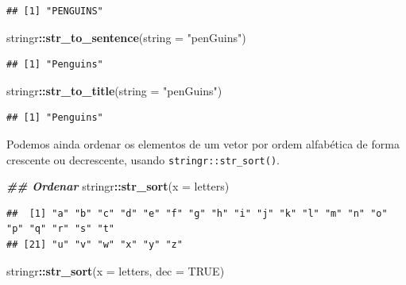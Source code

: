 \documentclass[
]{article}
\newenvironment{Shaded}{\begin{snugshade}}{\end{snugshade}}
\newcommand{\AttributeTok}[1]{\textcolor[rgb]{0.13,0.29,0.53}{#1}}
\newcommand{\ConstantTok}[1]{\textcolor[rgb]{0.56,0.35,0.01}{#1}}
\newcommand{\DocumentationTok}[1]{\textcolor[rgb]{0.56,0.35,0.01}{\textbf{\textit{#1}}}}
\newcommand{\FunctionTok}[1]{\textcolor[rgb]{0.13,0.29,0.53}{\textbf{#1}}}
\newcommand{\NormalTok}[1]{#1}
\newcommand{\SpecialCharTok}[1]{\textcolor[rgb]{0.81,0.36,0.00}{\textbf{#1}}}
\newcommand{\StringTok}[1]{\textcolor[rgb]{0.31,0.60,0.02}{#1}}
\begin{document}
\begin{verbatim}
## [1] "PENGUINS"
\end{verbatim}

\begin{Shaded}
\begin{Highlighting}[]
\NormalTok{stringr}\SpecialCharTok{::}\FunctionTok{str\_to\_sentence}\NormalTok{(}\AttributeTok{string =} \StringTok{"penGuins"}\NormalTok{)}
\end{Highlighting}
\end{Shaded}

\begin{verbatim}
## [1] "Penguins"
\end{verbatim}

\begin{Shaded}
\begin{Highlighting}[]
\NormalTok{stringr}\SpecialCharTok{::}\FunctionTok{str\_to\_title}\NormalTok{(}\AttributeTok{string =} \StringTok{"penGuins"}\NormalTok{)}
\end{Highlighting}
\end{Shaded}

\begin{verbatim}
## [1] "Penguins"
\end{verbatim}

Podemos ainda ordenar os elementos de um vetor por ordem alfabética de forma crescente ou decrescente, usando \texttt{stringr::str\_sort()}.

\begin{Shaded}
\begin{Highlighting}[]
\DocumentationTok{\#\# Ordenar}
\NormalTok{stringr}\SpecialCharTok{::}\FunctionTok{str\_sort}\NormalTok{(}\AttributeTok{x =}\NormalTok{ letters)}
\end{Highlighting}
\end{Shaded}

\begin{verbatim}
##  [1] "a" "b" "c" "d" "e" "f" "g" "h" "i" "j" "k" "l" "m" "n" "o" "p" "q" "r" "s" "t"
## [21] "u" "v" "w" "x" "y" "z"
\end{verbatim}

\begin{Shaded}
\begin{Highlighting}[]
\NormalTok{stringr}\SpecialCharTok{::}\FunctionTok{str\_sort}\NormalTok{(}\AttributeTok{x =}\NormalTok{ letters, }\AttributeTok{dec =} \ConstantTok{TRUE}\NormalTok{)}
\end{Highlighting}
\end{Shaded}
\end{document}
